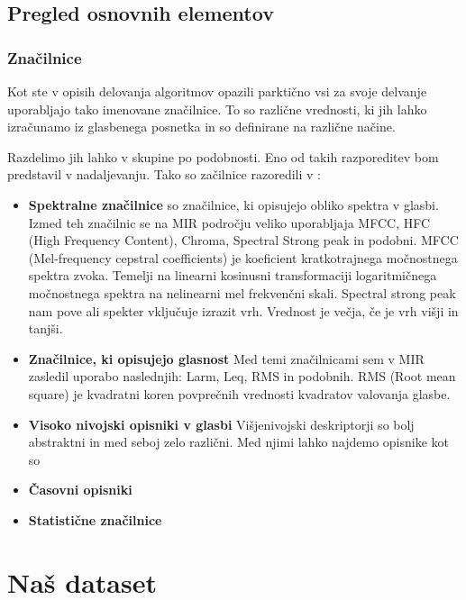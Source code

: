 \documentclass[a4paper, 12pt]{book}
\begin{document}
{\section{Pregled osnovnih elementov}

\subsection{Značilnice}

Kot ste v opisih delovanja algoritmov opazili parktično vsi za svoje delvanje uporabljajo tako imenovane značilnice. To so različne vrednosti, ki jih lahko izračunamo iz glasbenega posnetka in so definirane na različne načine.

Razdelimo jih lahko v skupine po podobnosti. Eno od takih razporeditev bom predstavil v nadaljevanju. Tako so začilnice razoredili v \cite{laurier2007audio}:

\begin{itemize}
  \item \textbf{Spektralne značilnice} so značilnice, ki opisujejo obliko spektra v glasbi. Izmed teh značilnic se na MIR področju veliko uporabljaja MFCC, HFC (High Frequency Content), Chroma, Spectral Strong peak in podobni. 
MFCC \cite{gunderson2007musical} (Mel-frequency cepstral coefficients) je koeficient kratkotrajnega močnostnega spektra zvoka. Temelji na linearni kosinusni transformaciji logaritmičnega močnostnega spektra na nelinearni mel frekvenčni skali. Spectral strong peak \cite{gouyon2001exploration} nam pove ali spekter vključuje izrazit vrh. Vrednost je večja, če je vrh višji in tanjši. 
  \item \textbf{Značilnice, ki opisujejo glasnost} Med temi značilnicami sem v MIR zasledil uporabo naslednjih: Larm, Leq, RMS in podobnih. RMS (Root mean square) \cite{bausch1996root} je kvadratni koren povprečnih vrednosti kvadratov valovanja glasbe.
  \item \textbf{Visoko nivojski opisniki v glasbi} Višjenivojski deskriptorji so bolj abstraktni in med seboj zelo različni. Med njimi lahko najdemo opisnike kot so 
  \item \textbf{Časovni opisniki}
  \item \textbf{Statistične značilnice}
\end{itemize}

\chapter{Naš dataset}

}
\end{document}
